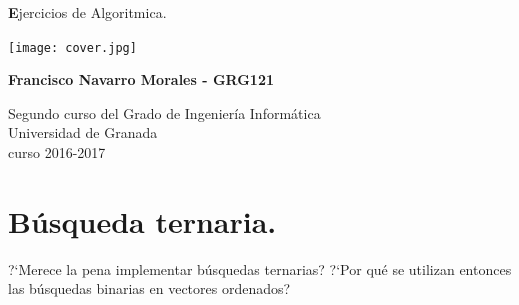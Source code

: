 \documentclass[a4paper, 11pt]{article}
\begin{document}
	
	
	\begin{titlepage}
		\begin{center}
			\vspace*{2cm}
			
			{\Huge \textbf Ejercicios de Algoritmica.}
			
			
			\vspace{0.5cm}
			
			
		    \centering \texttt{[image: cover.jpg]}
		    
			
			\vspace{2cm}
			
			\textbf{Francisco Navarro Morales - GRG121 }
			
			\vfill
			
			Segundo curso del Grado de Ingeniería Informática\\
			Universidad de Granada\\
			curso 2016-2017\\
			
		\end{center}
	\end{titlepage}



\renewcommand{\abstractname}{Resumen} %



{\parskip=2pt
  \tableofcontents
}


\pagebreak

\section{Búsqueda ternaria.}
?`Merece la pena implementar búsquedas ternarias? ?`Por qué se utilizan entonces las búsquedas binarias en vectores ordenados?
\end{document}
